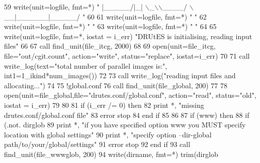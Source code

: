 \begin{DoxyCode}
59       \textcolor{keyword}{write}(unit=logfile, fmt=*)  \textcolor{stringliteral}{" |\_\_\_\_\_/|\_|  \(\backslash\)\_\(\backslash\)\(\backslash\)\_\_\_\_/ \(\backslash\)\_\_|\_\_\_\_\_\_|\_\_\_\_\_/ "}
60       
61       \textcolor{keyword}{write}(unit=logfile, fmt=*)  \textcolor{stringliteral}{" "}
62       \textcolor{keyword}{write}(unit=logfile, fmt=*)  \textcolor{stringliteral}{" "}
63       \textcolor{keyword}{write}(unit=logfile, fmt=*)  \textcolor{stringliteral}{" "}
64     
65       \textcolor{keyword}{write}(unit=logfile, fmt=*, iostat = i\_err) \textcolor{stringliteral}{"DRUtES is initialising, reading input files"}
66 
67       \textcolor{keyword}{call }find_unit(file_itcg, 2000)
68 
69       \textcolor{keyword}{open}(unit=file_itcg, file=\textcolor{stringliteral}{"out/cgit.count"}, action=\textcolor{stringliteral}{"write"}, status\textcolor{comment}{=}\textcolor{stringliteral}{"replace"}\textcolor{comment}{, iostat=i\_err)}
70 \textcolor{comment}{      }
71 \textcolor{comment}{      }\textcolor{keyword}{call }write_log(text=\textcolor{stringliteral}{"total number of parallel images is:"}, int1=1\_ikind\textcolor{comment}{*num\_images())}
72 \textcolor{comment}{}
73 \textcolor{comment}{      }\textcolor{keyword}{call }write_log(\textcolor{stringliteral}{"reading input files and allocating..."})
74 
75       \textcolor{comment}{!global.conf}
76       \textcolor{keyword}{call }find_unit(file_global, 200)
77       
78       \textcolor{keyword}{open}(unit=file_global,file=\textcolor{stringliteral}{"drutes.conf/global.conf"}, action=\textcolor{stringliteral}{"read"}\textcolor{comment}{, status=}\textcolor{stringliteral}{"old"}\textcolor{comment}{, iostat = i\_err)}
79 \textcolor{comment}{}
80 \textcolor{comment}{}
81 \textcolor{comment}{      }\textcolor{keywordflow}{if} (i\_err /= 0) \textcolor{keywordflow}{then}
82         print *, \textcolor{stringliteral}{"missing drutes.conf/global.conf file"}
83         error stop
84 \textcolor{keywordflow}{      end if}
85       
86       
87       \textcolor{keywordflow}{if} (www) \textcolor{keywordflow}{then}
88         \textcolor{keywordflow}{if} (.not. dirglob%
89           print *, \textcolor{stringliteral}{"if you have specified option www you MUST specify location with global settings"}
90           print *, \textcolor{stringliteral}{"specify option --dir-global path/to/your/global/settings"}
91           error stop
92 \textcolor{keywordflow}{        end if}
93         \textcolor{keyword}{call }find_unit(file_wwwglob, 200)
94         \textcolor{keyword}{write}(dirname, fmt=*) trim(dirglob%

\end{DoxyCode}
